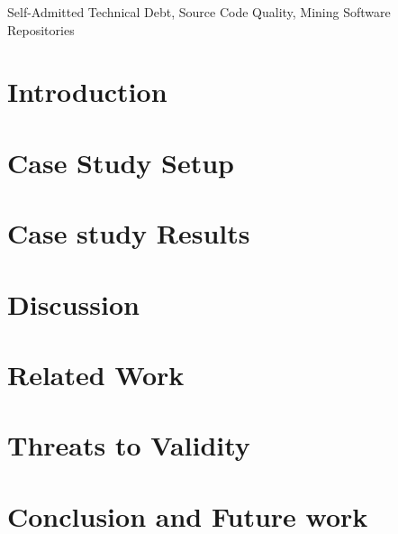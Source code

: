 \documentclass[10pt, conference]{IEEEtran}
\begin{document}
\begin{IEEEkeywords}
Self-Admitted Technical Debt, Source Code Quality, Mining Software Repositories
\end{IEEEkeywords}


\section{Introduction}
\label{sec:introduction}


% 

\section{Case Study Setup}
\label{sec:approach}


\section{Case study Results}
\label{sec:case_study_results}


\section{Discussion}
\label{sec:discussion}


\section{Related Work}
\label{sec:related_work}



\section{Threats to Validity}
\label{sec:threats_to_validity}


\section{Conclusion and Future work}
\label{sec:conclusion}



\balance
  
\end{document}
